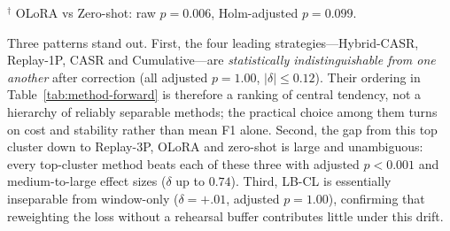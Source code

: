 \documentclass[a4paper,twoside]{article}
\begin{document}
\begin{table}[t]
  \centering
  \caption{Pairwise comparison of methods on common forward-evaluation windows. Upper triangle: Cliff's $\delta$ (positive means the row method scores higher). Lower triangle: Holm-adjusted paired-Wilcoxon $p$. Bold $p<0.05$. Analysis newly added in this extended version.}
  \label{tab:pairwise}
  \vspace{1mm}
  {\footnotesize $^\dagger$ OLoRA vs Zero-shot: raw $p=0.006$, Holm-adjusted $p=0.099$.}
\end{table}

Three patterns stand out. First, the four leading strategies---Hybrid-CASR, Replay-1P, CASR and Cumulative---are \emph{statistically indistinguishable from one another} after correction (all adjusted $p=1.00$, $|\delta|\le 0.12$). Their ordering in Table~\ref{tab:method-forward} is therefore a ranking of central tendency, not a hierarchy of reliably separable methods; the practical choice among them turns on cost and stability rather than mean F1 alone. Second, the gap from this top cluster down to Replay-3P, OLoRA and zero-shot is large and unambiguous: every top-cluster method beats each of these three with adjusted $p<0.001$ and medium-to-large effect sizes ($\delta$ up to $0.74$). Third, LB-CL is essentially inseparable from window-only ($\delta=+.01$, adjusted $p=1.00$), confirming that reweighting the loss without a rehearsal buffer contributes little under this drift.
\end{document}
